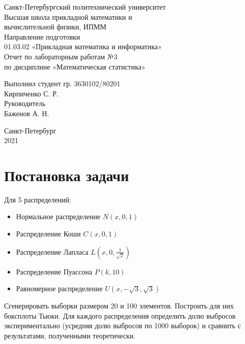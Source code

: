 \documentclass[a4paper,12pt]{article} %
\begin{document}

\large
\begin{center}
    Санкт-Петербургский политехнический университет\\
    Высшая школа прикладной математики и\\вычислительной физики, ИПММ\\
    \vspace{5em}
    Направление подготовки\\
    01.03.02 «Прикладная математика и информатика»\\
    \vspace{3em}
    Отчет по лабораторным работам №3\\
    по дисциплине «Математическая статистика»
    \vspace{15em}
\end{center}
Выполнил студент гр. 3630102/80201\\
Кирпиченко С. Р.\\
Руководитель\\
Баженов А. Н.
\vspace{7em}
\begin{center}
    Санкт-Петербург\\
    2021
\end{center}
\thispagestyle{empty}
\newpage
\tableofcontents
{}
\newpage
\listoffigures
{}
\newpage
\listoftables
{}
\thispagestyle{empty}
\newpage
\section{Постановка задачи}
Для 5 распределений:
\begin{itemize}
    \item Нормальное распределение $N(x, 0, 1)$
    \item Распределение Коши $C(x, 0, 1)$
    \item Распределение Лапласа $L(x, 0, \frac{1}{\sqrt{2}})$
    \item Распределение Пуассона $P(k, 10)$
    \item Равномерное распределение $U(x,-\sqrt{3},\sqrt{3})$
\end{itemize}
Сгенерировать выборки размером 20 и 100 элементов.
Построить для них боксплоты Тьюки.
Для каждого распределения определить долю выбросов экспериментально (усредняя долю выбросов по 1000 выборок) и сравнить с результатами, полученными теоретически.
\end{document}
